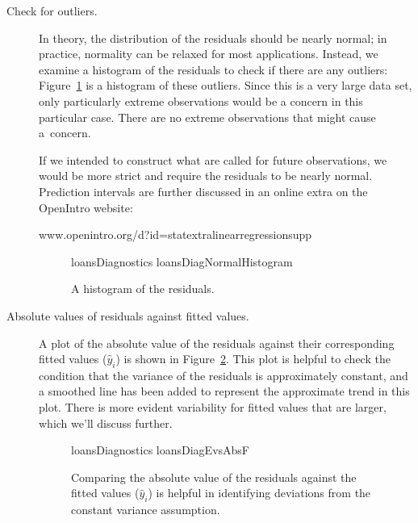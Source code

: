 \begin{description}
\item[Check for outliers.]
    In theory, the distribution of the residuals should
    be nearly normal;
    in practice, normality can be relaxed for most applications.
    Instead, we examine a histogram of the residuals
    to check if there are any outliers:
    Figure~\ref{loansDiagNormalHistogram}
    is a histogram of these outliers.
    Since this is a very large data set,
    only particularly extreme observations would be a concern
    in this particular case.
    There are no extreme observations that might cause a~concern.

    If we intended to construct what are called
    for future observations,
    we would be more strict and
    require the residuals to be nearly normal.
    Prediction intervals are further discussed in
    an online extra on the OpenIntro website:\vspace{-2mm}
    \begin{center}
          {www.openintro.org/d?id=stat\us{}extra\us{}linear\us{}regression\us{}supp}
    \end{center}

\begin{figure}[h]
  \centering
      {loansDiagnostics}
      {loansDiagNormalHistogram}
  \caption{A histogram of the residuals.}
  \label{loansDiagNormalHistogram}
\end{figure}

\item[Absolute values of residuals against fitted values.]
    A plot of the absolute value of the residuals against
    their corresponding fitted values ($\hat{y}_i$) is shown
    in Figure~\ref{loansDiagEvsAbsF}.
    This plot is helpful to check the condition that the
    variance of the residuals is approximately constant,
    and a smoothed line has been added to represent the
    approximate trend in this plot.
    There is more evident variability for fitted values that are
    larger, which we'll discuss further.

\begin{figure}[h]
  \centering
      {loansDiagnostics}
      {loansDiagEvsAbsF}
  \caption{Comparing the absolute value of the residuals against the fitted values ($\hat{y}_i$) is helpful in identifying deviations from the constant variance assumption.}
  \label{loansDiagEvsAbsF}
\end{figure}


\end{description}
